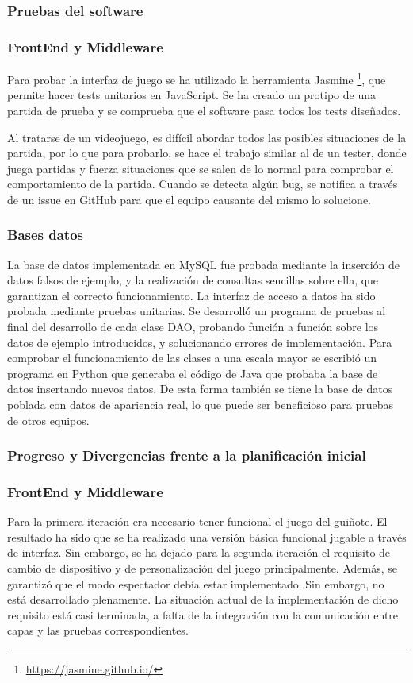 \subsubsection{Pruebas del software}
\subsubsection*{FrontEnd y Middleware}
Para probar la interfaz de juego se ha utilizado la herramienta Jasmine \footnote{ \url{https://jasmine.github.io/} }, que permite hacer tests unitarios en JavaScript. Se ha creado un protipo de una partida de prueba y se comprueba que el software pasa todos los tests diseñados.

Al tratarse de un videojuego, es difícil abordar todos las posibles situaciones de la partida, por lo que para probarlo, se hace el trabajo similar al de un tester, donde juega partidas y fuerza situaciones que se salen de lo normal para comprobar el comportamiento de la partida. Cuando se detecta algún bug, se notifica a través de un issue en GitHub para que el equipo causante del mismo lo solucione.

\subsubsection*{Bases datos}
La base de datos implementada en MySQL fue probada mediante la inserción de datos falsos de ejemplo, y la realización de consultas sencillas sobre ella, que garantizan el correcto funcionamiento. La interfaz de acceso a datos ha sido probada mediante pruebas unitarias. Se desarrolló un programa de pruebas al final del desarrollo de cada clase DAO, probando función a función sobre los datos de ejemplo introducidos, y solucionando errores de implementación. Para comprobar el funcionamiento de las clases a una escala mayor se escribió un programa en Python que generaba el código de Java que probaba la base de datos insertando nuevos datos. De esta forma también se tiene la base de datos poblada con datos de apariencia real, lo que puede ser beneficioso para pruebas de otros equipos.

\subsubsection*{Progreso y Divergencias frente a la planificación inicial}
\subsubsection*{FrontEnd y Middleware}
Para la primera iteración era necesario tener funcional el juego del guiñote. El resultado ha sido que se ha realizado una versión básica funcional jugable a través de interfaz. Sin embargo, se ha dejado para la segunda iteración el requisito de cambio de dispositivo y de personalización del juego principalmente. Además, se garantizó que el modo espectador debía estar implementado. Sin embargo, no está desarrollado plenamente. La situación actual de la implementación de dicho requisito está casi terminada, a falta de la integración con la comunicación entre capas y las pruebas correspondientes.

